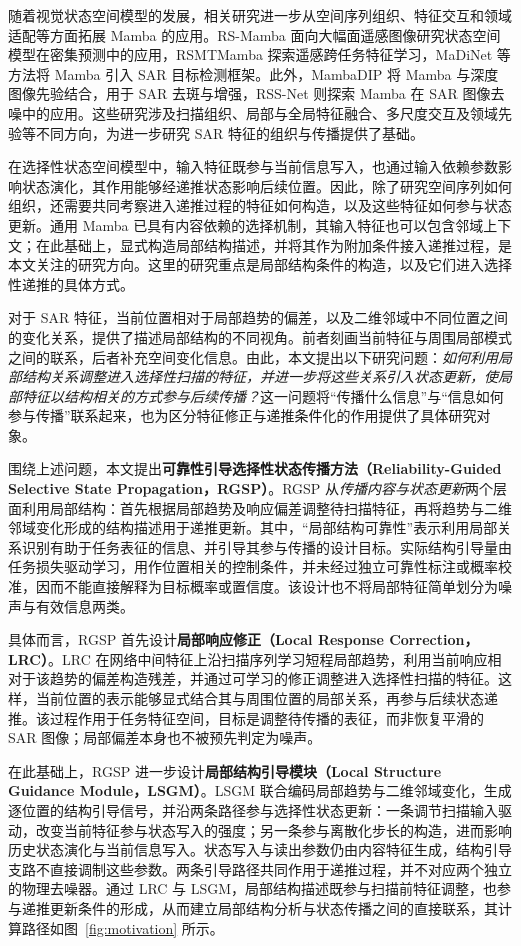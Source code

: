 \documentclass[journal]{IEEEtran}
\begin{document}
随着视觉状态空间模型的发展，相关研究进一步从空间序列组织、特征交互和领域适配等方面拓展 Mamba 的应用。RS-Mamba 面向大幅面遥感图像研究状态空间模型在密集预测中的应用\cite{rsmamba2024}，RSMTMamba 探索遥感跨任务特征学习\cite{rstmtmamba2025}，MaDiNet 等方法将 Mamba 引入 SAR 目标检测框架\cite{madinet2025}。此外，MambaDIP 将 Mamba 与深度图像先验结合，用于 SAR 去斑与增强\cite{mambadip}，RSS-Net 则探索 Mamba 在 SAR 图像去噪中的应用\cite{rssnet}。这些研究涉及扫描组织、局部与全局特征融合、多尺度交互及领域先验等不同方向，为进一步研究 SAR 特征的组织与传播提供了基础。

在选择性状态空间模型中，输入特征既参与当前信息写入，也通过输入依赖参数影响状态演化，其作用能够经递推状态影响后续位置。因此，除了研究空间序列如何组织，还需要共同考察进入递推过程的特征如何构造，以及这些特征如何参与状态更新。通用 Mamba 已具有内容依赖的选择机制，其输入特征也可以包含邻域上下文；在此基础上，显式构造局部结构描述，并将其作为附加条件接入递推过程，是本文关注的研究方向。这里的研究重点是局部结构条件的构造，以及它们进入选择性递推的具体方式。

对于 SAR 特征，当前位置相对于局部趋势的偏差，以及二维邻域中不同位置之间的变化关系，提供了描述局部结构的不同视角。前者刻画当前特征与周围局部模式之间的联系，后者补充空间变化信息。由此，本文提出以下研究问题：\emph{如何利用局部结构关系调整进入选择性扫描的特征，并进一步将这些关系引入状态更新，使局部特征以结构相关的方式参与后续传播？}这一问题将“传播什么信息”与“信息如何参与传播”联系起来，也为区分特征修正与递推条件化的作用提供了具体研究对象。

围绕上述问题，本文提出\textbf{可靠性引导选择性状态传播方法（Reliability-Guided Selective State Propagation，RGSP）}。RGSP 从\emph{传播内容与状态更新}两个层面利用局部结构：首先根据局部趋势及响应偏差调整待扫描特征，再将趋势与二维邻域变化形成的结构描述用于递推更新。其中，“局部结构可靠性”表示利用局部关系识别有助于任务表征的信息、并引导其参与传播的设计目标。实际结构引导量由任务损失驱动学习，用作位置相关的控制条件，并未经过独立可靠性标注或概率校准，因而不能直接解释为目标概率或置信度。该设计也不将局部特征简单划分为噪声与有效信息两类。

具体而言，RGSP 首先设计\textbf{局部响应修正（Local Response Correction，LRC）}。LRC 在网络中间特征上沿扫描序列学习短程局部趋势，利用当前响应相对于该趋势的偏差构造残差，并通过可学习的修正调整进入选择性扫描的特征。这样，当前位置的表示能够显式结合其与周围位置的局部关系，再参与后续状态递推。该过程作用于任务特征空间，目标是调整待传播的表征，而非恢复平滑的 SAR 图像；局部偏差本身也不被预先判定为噪声。

在此基础上，RGSP 进一步设计\textbf{局部结构引导模块（Local Structure Guidance Module，LSGM）}。LSGM 联合编码局部趋势与二维邻域变化，生成逐位置的结构引导信号，并沿两条路径参与选择性状态更新：一条调节扫描输入驱动，改变当前特征参与状态写入的强度；另一条参与离散化步长的构造，进而影响历史状态演化与当前信息写入。状态写入与读出参数仍由内容特征生成，结构引导支路不直接调制这些参数。两条引导路径共同作用于递推过程，并不对应两个独立的物理去噪器。通过 LRC 与 LSGM，局部结构描述既参与扫描前特征调整，也参与递推更新条件的形成，从而建立局部结构分析与状态传播之间的直接联系，其计算路径如图~\ref{fig:motivation} 所示。
\end{document}
